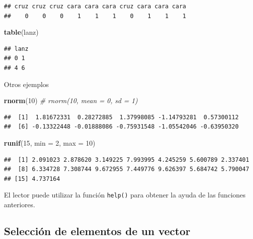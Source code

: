 \documentclass[]{book}
\newenvironment{Shaded}{\begin{snugshade}}{\end{snugshade}}
\newcommand{\KeywordTok}[1]{\textcolor[rgb]{0.13,0.29,0.53}{\textbf{#1}}}
\newcommand{\DataTypeTok}[1]{\textcolor[rgb]{0.13,0.29,0.53}{#1}}
\newcommand{\DecValTok}[1]{\textcolor[rgb]{0.00,0.00,0.81}{#1}}
\newcommand{\CommentTok}[1]{\textcolor[rgb]{0.56,0.35,0.01}{\textit{#1}}}
\newcommand{\NormalTok}[1]{#1}
\begin{document}
\begin{verbatim}
## cruz cruz cruz cara cara cara cruz cara cara cara 
##    0    0    0    1    1    1    0    1    1    1
\end{verbatim}

\begin{Shaded}
\begin{Highlighting}[]
\KeywordTok{table}\NormalTok{(lanz)}
\end{Highlighting}
\end{Shaded}

\begin{verbatim}
## lanz
## 0 1 
## 4 6
\end{verbatim}

Otros ejemplos

\begin{Shaded}
\begin{Highlighting}[]
\KeywordTok{rnorm}\NormalTok{(}\DecValTok{10}\NormalTok{)  }\CommentTok{# rnorm(10, mean = 0, sd = 1)}
\end{Highlighting}
\end{Shaded}

\begin{verbatim}
##  [1]  1.81672331  0.28272885  1.37998085 -1.14793281  0.57300112
##  [6] -0.13322448 -0.01888086 -0.75931548 -1.05542046 -0.63950320
\end{verbatim}

\begin{Shaded}
\begin{Highlighting}[]
\KeywordTok{runif}\NormalTok{(}\DecValTok{15}\NormalTok{, }\DataTypeTok{min =} \DecValTok{2}\NormalTok{, }\DataTypeTok{max =} \DecValTok{10}\NormalTok{)}
\end{Highlighting}
\end{Shaded}

\begin{verbatim}
##  [1] 2.091023 2.878620 3.149225 7.993995 4.245259 5.600789 2.337401
##  [8] 6.334728 7.308744 9.672955 7.449776 9.626397 5.684742 5.790047
## [15] 4.737164
\end{verbatim}

El lector puede utilizar la función \texttt{help()} para obtener la
ayuda de las funciones anteriores.

\subsection{Selección de elementos de un
vector}\label{seleccion-de-elementos-de-un-vector}
\end{document}
